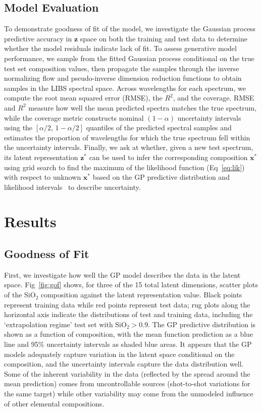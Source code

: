 \documentclass[letterpaper]{article} %
\begin{document}
\subsection{Model Evaluation}
To demonstrate goodness of fit of the model, we investigate the Gaussian process predictive accuracy in $\mathbf{z}$ space on both the training and test data to determine whether the model residuals indicate lack of fit.
To assess generative model performance, we sample from the fitted Gaussian process conditional on the true test set composition values, then propagate the samples through the inverse normalizing flow and pseudo-inverse dimension reduction functions to obtain samples in the LIBS spectral space.
Across wavelengths for each spectrum, we compute the root mean squared error (RMSE), the $R^2$, and the coverage.
RMSE and $R^2$ measure how well the mean predicted spectra matches the true spectrum, while the coverage metric constructs nominal $(1-\alpha)$ uncertainty intervals using the $[\alpha/2, \, 1-\alpha/2]$ quantiles of the predicted spectral samples and estimates the proportion of wavelengths for which the true spectrum fell within the uncertainty intervals.
Finally, we ask at whether, given a new test spectrum, its latent representation $\mathbf{z}^*$ can be used to infer the corresponding composition $\mathbf{x}^*$ 
using grid search to find the maximum of the likelihood function (Eq~\ref{eq:lik}) with respect to unknown $\mathbf{x}^*$ based on the GP predictive distribution and likelihood intervals~\cite{owen1988empirical} to describe uncertainty.

\section{Results}

\subsection{Goodness of Fit}
First, we investigate how well the GP model describes the data in the latent space.
Fig~\ref{fig:gof} shows, for three of the 15 total latent dimensions, scatter plots of the SiO$_2$ composition against the latent representation value.
Black points represent training data while red points represent test data; rug plots along the horizontal axis indicate the distributions of test and training data, including the `extrapolation regime' test set with SiO$_2 > 0.9$. 
The GP predictive distribution is shown as a function of composition, with the mean function prediction as a blue line and 95\% uncertainty intervals as shaded blue areas.
It appears that the GP models adequately capture variation in the latent space conditional on the composition, and the uncertainty intervals capture the data distribution well.
Some of the inherent variability in the data (reflected by the spread around the mean prediction) comes from uncontrollable sources (shot-to-shot variations for the same target) while other variability may come from the unmodeled influence of other elemental compositions.
\end{document}
